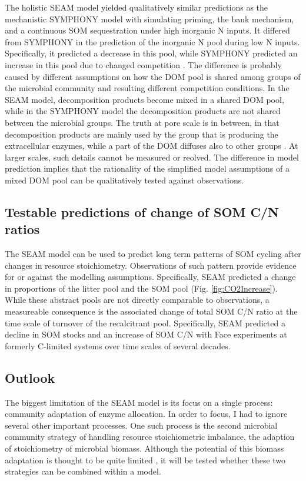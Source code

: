 The holistic SEAM model yielded qualitatively similar predictions as the
mechanistic SYMPHONY model with simulating priming, the bank mechanism, and a
continuous SOM sequestration under high inorganic N inputs. It differed from
SYMPHONY in the prediction of the inorganic N pool during low N inputs.
Specifically, it predicted a decrease in this pool, while SYMPHONY predicted an
increase in this pool due to changed competition \citep{Perveen14}. The
difference is probably caused by different assumptions on how the DOM pool is
shared among groups of the microbial community and resulting different
competition conditions. In the SEAM model, decomposition products become mixed
in a shared DOM pool, while in the SYMPHONY model the decomposition products are
not shared between the microbial groups.
The truth at pore scale is in between, in that decomposition products are mainly
used by the group that is producing the extracellular enzymes, while a part of
the DOM diffuses also to other groups \citep{Kaiser14}. At larger scales, such
details cannot be measured or reolved. The difference in model prediction
implies that the rationality of the simplified model assumptions of a mixed
DOM pool can be qualitatively tested against observations. 

\subsection{Testable predictions of change of SOM C/N ratios}
The SEAM model can be used to predict long term patterns of SOM cycling after
changes in resource stoichiometry. Observations of such pattern provide evidence
for or against the modelling assumptions.
Specifically, SEAM predicted a change in proportions of the litter pool and the
SOM pool (Fig. \ref{fig:CO2Increase}). While these abstract pools are not
directly comparable to observations, a measureable consequence is the associated
change of total SOM C/N ratio at the time scale of turnover of the recalcitrant
pool. Specifically, SEAM predicted a decline in SOM stocks and an increase of
SOM C/N with Face experiments at formerly C-limited systems over time scales of
several decades.
 
\subsection{Outlook} 
The biggest limitation of the SEAM model is its focus on a single process:
community adaptation of enzyme allocation. In order to focus, I had to ignore
several other important processes. One such process is the second microbial
community strategy of handling resource stoichiometric imbalance,
the adaption of stoichiometry of microbial biomass. Although the potential of this biomass
adaptation is thought to be quite limited \citep{Mooshammer14}, it will be
tested whether these two strategies can be combined within a model.

